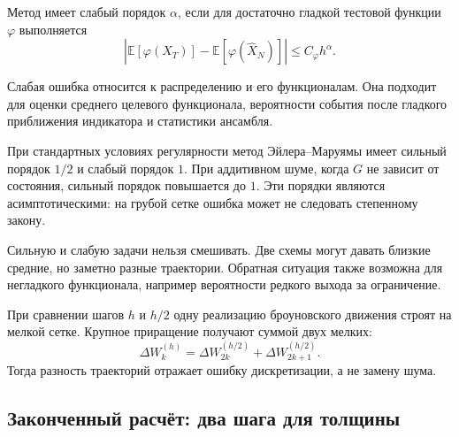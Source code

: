 \begin{definition}
Метод имеет слабый порядок $\alpha$, если для достаточно гладкой тестовой функции $\varphi$ выполняется
\begin{equation}
\label{eq:weak-convergence-v05}
\left|
\mathbb E[\varphi(X_T)]
-
\mathbb E[\varphi(\widehat X_N)]
\right|
\leq C_{\varphi} h^{\alpha}.
\end{equation}
\end{definition}
Слабая ошибка относится к распределению и его функционалам. Она подходит для оценки среднего целевого функционала, вероятности события после гладкого приближения индикатора и статистики ансамбля.

При стандартных условиях регулярности метод Эйлера--Маруямы имеет сильный порядок $1/2$ и слабый порядок $1$. При аддитивном шуме, когда $G$ не зависит от состояния, сильный порядок повышается до $1$. Эти порядки являются асимптотическими: на грубой сетке ошибка может не следовать степенному закону.

Сильную и слабую задачи нельзя смешивать. Две схемы могут давать близкие средние, но заметно разные траектории. Обратная ситуация также возможна для негладкого функционала, например вероятности редкого выхода за ограничение.

\begin{computationalnote}
При сравнении шагов $h$ и $h/2$ одну реализацию броуновского движения строят на мелкой сетке. Крупное приращение получают суммой двух мелких:
\begin{equation}
\label{eq:brownian-coupling-v05}
\Delta W_k^{(h)}
=
\Delta W_{2k}^{(h/2)}
+
\Delta W_{2k+1}^{(h/2)}.
\end{equation}
Тогда разность траекторий отражает ошибку дискретизации, а не замену шума.
\end{computationalnote}

\subsection{Законченный расчёт: два шага для толщины}

